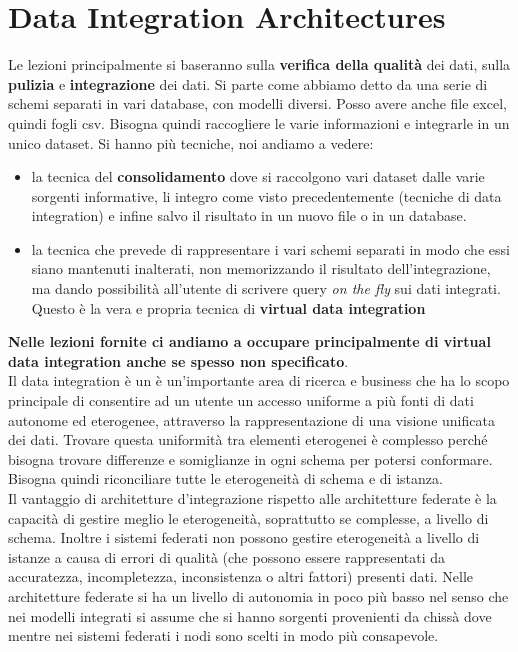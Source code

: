 \section{Data Integration Architectures}
Le lezioni principalmente si baseranno sulla \textbf{verifica della qualità} dei dati, sulla \textbf{pulizia} e \textbf{integrazione} dei dati.
Si parte come abbiamo detto da una serie di schemi separati in vari database, con modelli diversi. Posso avere anche file excel, quindi fogli csv. Bisogna quindi raccogliere le varie informazioni e integrarle in un unico dataset. Si hanno più tecniche, noi andiamo a vedere:
\begin{itemize}
  \item la tecnica del \textbf{consolidamento} dove si raccolgono vari dataset dalle varie sorgenti informative, li integro come visto precedentemente (tecniche di data integration) e infine salvo il risultato in un nuovo file o in un database.
  \item la tecnica che prevede di rappresentare i vari schemi separati in modo che essi siano mantenuti inalterati, non memorizzando il risultato dell'integrazione, ma dando possibilità all'utente di scrivere query \textit{on the fly} sui dati integrati. Questo è la vera e propria tecnica di \textbf{virtual data integration}
\end{itemize}
\textbf{Nelle lezioni fornite ci andiamo a occupare principalmente di virtual data integration anche se spesso non specificato}.\\
Il data integration è un è un'importante area di ricerca e business che ha lo scopo principale di consentire ad un utente un accesso uniforme a più fonti di dati autonome ed eterogenee, attraverso la rappresentazione di una visione unificata dei dati. Trovare questa uniformità tra elementi eterogenei è complesso perché bisogna trovare differenze e somiglianze in ogni schema per potersi conformare. Bisogna quindi riconciliare tutte le eterogeneità di schema e di istanza.\\ 

Il vantaggio di architetture d'integrazione rispetto alle architetture federate è la capacità di gestire meglio le eterogeneità, soprattutto se complesse, a livello di schema. Inoltre i sistemi federati non possono gestire eterogeneità a livello di istanze a causa di errori di qualità (che possono essere rappresentati da accuratezza, incompletezza, inconsistenza o altri fattori) presenti dati. Nelle architetture federate si ha un livello di autonomia in poco più basso nel senso che nei modelli integrati si assume che si hanno sorgenti provenienti da chissà dove mentre nei sistemi federati i nodi sono scelti in modo più consapevole.\\

